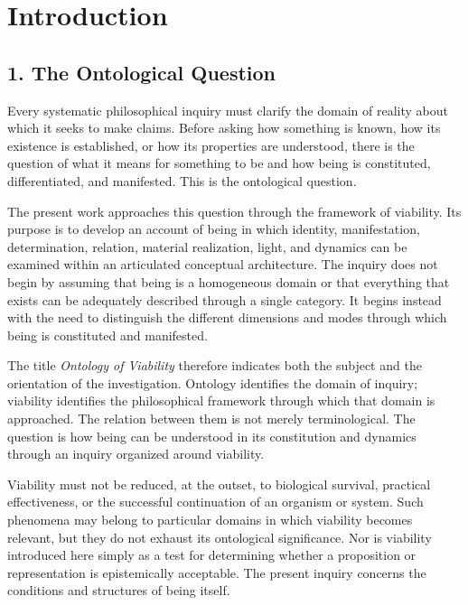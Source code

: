 
\cleardoublepage

\chapter*{Introduction}

{}


\section*{1. The Ontological Question}

Every systematic philosophical inquiry must clarify the
domain of reality about which it seeks to make claims.
Before asking how something is known, how its existence
is established, or how its properties are understood,
there is the question of what it means for something to be
and how being is constituted, differentiated, and manifested.
This is the ontological question.

The present work approaches this question through the
framework of viability. Its purpose is to develop an account
of being in which identity, manifestation, determination,
relation, material realization, light, and dynamics can be
examined within an articulated conceptual architecture.
The inquiry does not begin by assuming that being is a
homogeneous domain or that everything that exists can be
adequately described through a single category. It begins
instead with the need to distinguish the different dimensions
and modes through which being is constituted and manifested.

The title \textit{Ontology of Viability} therefore indicates
both the subject and the orientation of the investigation.
Ontology identifies the domain of inquiry; viability
identifies the philosophical framework through which that
domain is approached. The relation between them is not
merely terminological. The question is how being can be
understood in its constitution and dynamics through an
inquiry organized around viability.

Viability must not be reduced, at the outset, to biological
survival, practical effectiveness, or the successful
continuation of an organism or system. Such phenomena may
belong to particular domains in which viability becomes
relevant, but they do not exhaust its ontological significance.
Nor is viability introduced here simply as a test for
determining whether a proposition or representation is
epistemically acceptable. The present inquiry concerns the
conditions and structures of being itself.

